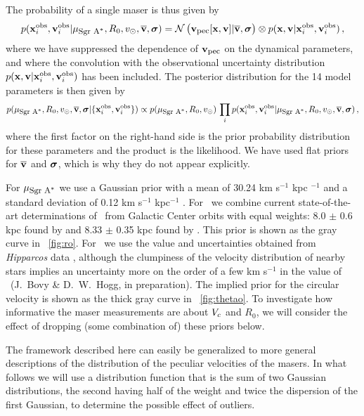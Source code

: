 The probability of a single maser is thus given by
\begin{equation}\label{eq:onelike}
p(\boldsymbol{\mathbf{x}}_i^{\mathrm{obs}},\boldsymbol{\mathbf{v}}_i^{\mathrm{obs}}|\mu_{\mbox{{\footnotesize Sgr A$^*$}}},R_0,v_\odot,\overline{\boldsymbol{\mathbf{v}}},\mbox{\boldmath$\sigma$}) =
\mathcal{N}\left(\boldsymbol{\mathbf{v}}_{\mbox{{\footnotesize pec}}}[\boldsymbol{\mathbf{x}},\boldsymbol{\mathbf{v}}]|\overline{\boldsymbol{\mathbf{v}}},\mbox{\boldmath$\sigma$}\right)\otimes p(\boldsymbol{\mathbf{x}},\boldsymbol{\mathbf{v}}|\boldsymbol{\mathbf{x}}_i^{\mathrm{obs}},\boldsymbol{\mathbf{v}}_i^{\mathrm{obs}})\,,
\end{equation}
where we have suppressed the dependence of $\boldsymbol{\mathbf{v}}_{\mbox{{\footnotesize pec}}}$ on the dynamical
parameters, and where the convolution with the observational
uncertainty distribution
$p(\boldsymbol{\mathbf{x}},\boldsymbol{\mathbf{v}}|\boldsymbol{\mathbf{x}}_i^{\mathrm{obs}},\boldsymbol{\mathbf{v}}_i^{\mathrm{obs}})$ has been
included. The posterior distribution for the 14 model parameters is
then given by
\begin{equation}\label{eq:posterior}
p(\mu_{\mbox{{\footnotesize Sgr A$^*$}}},R_0,v_\odot,\overline{\boldsymbol{\mathbf{v}}},\mbox{\boldmath$\sigma$}|\{\boldsymbol{\mathbf{x}}_i^{\mathrm{obs}},\boldsymbol{\mathbf{v}}_i^{\mathrm{obs}}\})
\propto p(\mu_{\mbox{{\footnotesize Sgr A$^*$}}},R_0,v_\odot)\,\prod_i
p(\boldsymbol{\mathbf{x}}_i^{\mathrm{obs}},\boldsymbol{\mathbf{v}}_i^{\mathrm{obs}}|\mu_{\mbox{{\footnotesize Sgr A$^*$}}},R_0,v_\odot,\overline{\boldsymbol{\mathbf{v}}},\mbox{\boldmath$\sigma$})\,,
\end{equation}
where the first factor on the right-hand side is the prior probability
distribution for these parameters and the product is the
likelihood. We have used flat priors for $\overline{\boldsymbol{\mathbf{v}}}$ and
$\mbox{\boldmath$\sigma$}$, which is why they do not appear explicitly.

For $\mu_{\mbox{{\footnotesize Sgr A$^*$}}}$ we use a Gaussian prior with a mean of 30.24 km s$^{-1}$
kpc $^{-1}$ and a standard deviation of 0.12 km s$^{-1}$ kpc$^{-1}$
\citep{Reid04a}. For \Ro\ we combine current state-of-the-art
determinations of \Ro\ from Galactic Center orbits with equal weights:
8.0 $\pm$ 0.6 kpc found by \citet{Ghez08a} and 8.33 $\pm$ 0.35 kpc
found by \citet{Gillessen09a}. This prior is shown as the gray curve
in \figurename~\ref{fig:ro}. For \vsunlsr\ we use the value and
uncertainties obtained from \emph{Hipparcos} data \citep{Hogg05a},
although the clumpiness of the velocity distribution of nearby stars
\citep{Dehnen98a,Bovy09a} implies an uncertainty more on the order of
a few km s$^{-1}$ in the value of \vsunlsr\ (J.~Bovy \& D.~W.~Hogg, in
preparation). The implied prior for the circular velocity is shown as
the thick gray curve in \figurename~\ref{fig:thetao}. To investigate
how informative the maser measurements are about $V_c$ and $R_0$, we
will consider the effect of dropping (some combination of) these
priors below.

The framework described here can easily be generalized to more general
descriptions of the distribution of the peculiar velocities of the
masers. In what follows we will use a distribution function that is
the sum of two Gaussian distributions, the second having half of the
weight and twice the dispersion of the first Gaussian, to determine
the possible effect of outliers.

